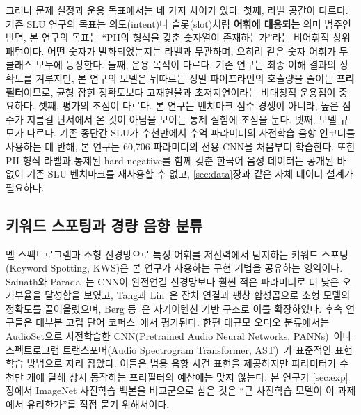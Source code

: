 \documentclass[11pt]{article}
\renewcommand{\emph}[1]{\textbf{#1}}
\begin{document}
그러나 문제 설정과 운용 목표에서는 네 가지 차이가 있다. 첫째, 라벨 공간이 다르다. 기존
SLU 연구의 목표는 의도(intent)나 슬롯(slot)처럼 \emph{어휘에 대응되는} 의미 범주인 반면,
본 연구의 목표는 ``PII의 형식을 갖춘 숫자열이 존재하는가''라는 비어휘적 상위 패턴이다.
어떤 숫자가 발화되었는지는 라벨과 무관하며, 오히려 같은 숫자 어휘가 두 클래스 모두에
등장한다. 둘째, 운용 목적이 다르다. 기존 연구는 최종 이해 결과의 정확도를 겨루지만, 본
연구의 모델은 뒤따르는 정밀 파이프라인의 호출량을 줄이는 \emph{프리필터}이므로, 균형
잡힌 정확도보다 고재현율과 초저지연이라는 비대칭적 운용점이 중요하다. 셋째, 평가의 초점이
다르다. 본 연구는 벤치마크 점수 경쟁이 아니라, 높은 점수가 지름길 단서에서 온 것이 아님을
보이는 통제 실험에 초점을 둔다. 넷째, 모델 규모가 다르다. 기존 종단간 SLU가 수천만에서
수억 파라미터의 사전학습 음향 인코더를 사용하는 데 반해, 본 연구는 60{,}706 파라미터의
전용 CNN을 처음부터 학습한다. 또한 PII 형식 라벨과 통제된 hard-negative를 함께 갖춘 한국어
음성 데이터는 공개된 바 없어 기존 SLU 벤치마크를 재사용할 수 없고, \ref{sec:data}장과 같은
자체 데이터 설계가 필요하다.

\subsection{키워드 스포팅과 경량 음향 분류}
멜 스펙트로그램과 소형 신경망으로 특정 어휘를 저전력에서 탐지하는 키워드 스포팅(Keyword
Spotting, KWS)은 본 연구가 사용하는 구현 기법을 공유하는 영역이다. Sainath와
Parada~\cite{sainath2015cnnkws}는 CNN이 완전연결 신경망보다 훨씬 적은 파라미터로 더 낮은
오거부율을 달성함을 보였고, Tang과 Lin~\cite{tang2018resnetkws}은 잔차 연결과 팽창
합성곱으로 소형 모델의 정확도를 끌어올렸으며, Berg 등~\cite{berg2021keyword}은 자기어텐션
기반 구조로 이를 확장하였다. 후속 연구들은 대부분 고립 단어
코퍼스~\cite{warden2018speech}에서 평가된다. 한편 대규모 오디오 분류에서는 AudioSet으로
사전학습한 CNN(Pretrained Audio Neural Networks,
PANNs)~\cite{kong2020panns}이나 스펙트로그램 트랜스포머(Audio Spectrogram Transformer,
AST)~\cite{gong2021ast}가
표준적인 표현 학습 방법으로 자리 잡았다. 이들은 범용 음향 사건 표현을 제공하지만 파라미터가
수천만 개에 달해 상시 동작하는 프리필터의 예산에는 맞지 않는다. 본 연구가 \ref{sec:exp}장에서
ImageNet 사전학습 백본을 비교군으로 삼은 것은 ``큰 사전학습 모델이 이 과제에서 유리한가''를
직접 묻기 위해서이다.
\end{document}
